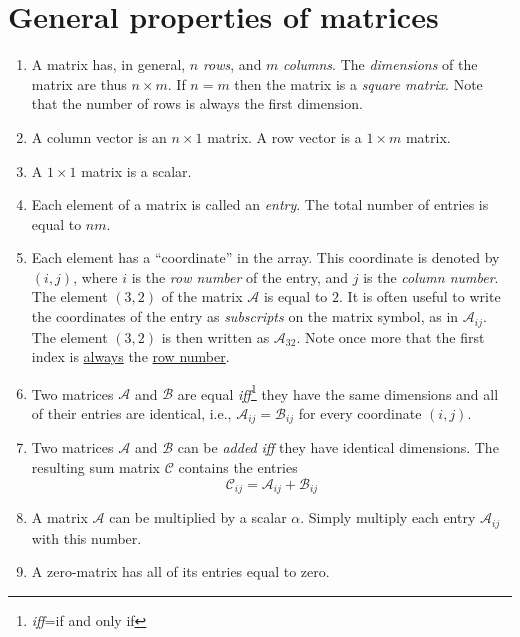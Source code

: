 \section{General properties of matrices}\label{\chabbr:sec:matrixproperties}
\begin{enumerate}
\item A matrix has, in general, $n$ \textit{rows}, and $m$ \textit{columns}.  The \textit{dimensions} of the matrix
are thus $n\times m$.  If $n=m$ then the matrix is a \textit{square matrix}.  Note that the number of rows is always 
the first dimension.

\item A column vector is an $n\times 1$ matrix.  A row vector is a $1\times m$ matrix.

\item A $1\times 1$ matrix is a scalar.

\item Each element of a matrix is called an \textit{entry}.  The total number of entries is equal to $nm$.

\item Each element has a ``coordinate'' in the array.  This coordinate is denoted by $(i,j)$, where $i$ is the \textit{row number} of the entry,
and $j$ is the \textit{column number}.  The element $(3,2)$ of the matrix $\mathcal{A}$ is equal to $2$.  It is often useful to write
the coordinates of the entry as \textit{subscripts} on the matrix symbol, as in $\mathcal{A}_{ij}$.  The element $(3,2)$ is then written as $\mathcal{A}_{32}$.
Note once more that the first index is \underline{always} the \underline{row number}.

\item Two matrices $\mathcal{A}$ and $\mathcal{B}$ are equal \textit{iff}\footnote{\textit{iff}=if and only if} they have the same dimensions and 
all of their entries are identical, i.e., $\mathcal{A}_{ij}=\mathcal{B}_{ij}$ for every coordinate $(i,j)$.

\item Two matrices $\mathcal{A}$ and $\mathcal{B}$ can be \textit{added} \textit{iff} they have identical dimensions.  The resulting sum matrix $\mathcal{C}$
contains the entries
\[
\mathcal{C}_{ij}=\mathcal{A}_{ij}+\mathcal{B}_{ij}
\]

\item A matrix $\mathcal{A}$ can be multiplied by a scalar $\alpha$.  Simply multiply each entry $\mathcal{A}_{ij}$ with this number.

\item A zero-matrix has all of its entries equal to zero.


\end{enumerate}
